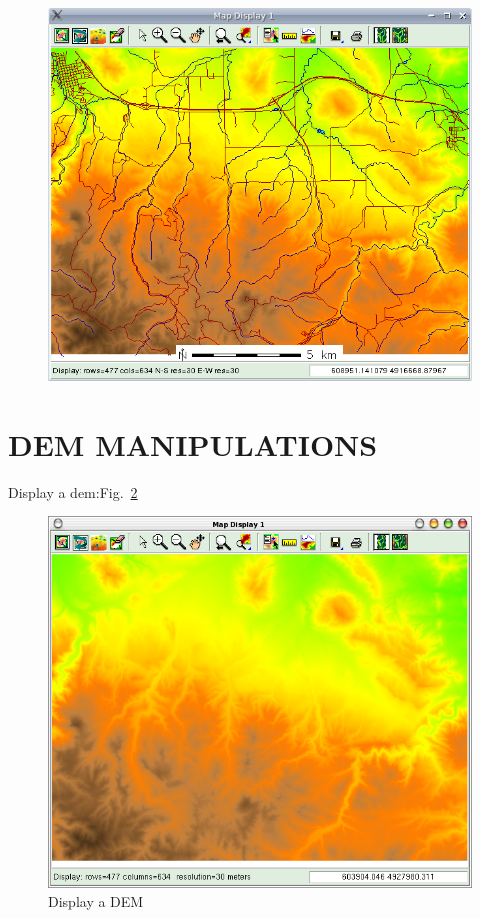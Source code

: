 \begin{figure}[htbp]
   \centering
   \includegraphics[scale=0.35]{grass008.png}
   \caption{}
   \label{fig:grass008}
\end{figure}

\section{DEM MANIPULATIONS}
Display a dem:Fig.~\ref{fig:grass009}

\begin{figure}[htbp]
   \centering
   \includegraphics[scale=0.35]{grass009.png}
   \caption{Display a DEM}
   \label{fig:grass009}
\end{figure}

